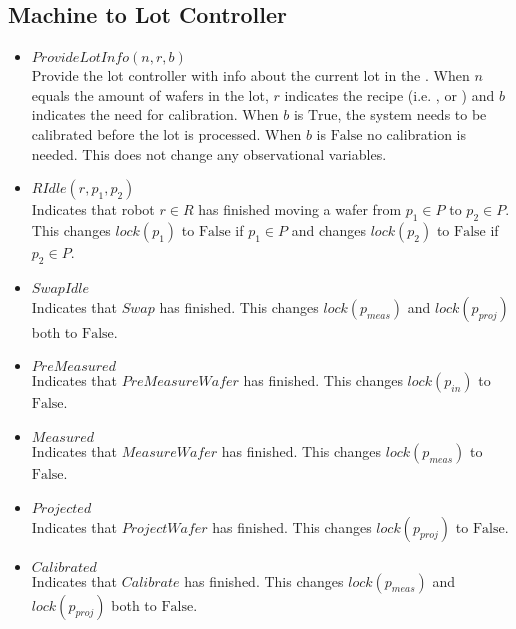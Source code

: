 \subsection{Machine to Lot Controller}
\begin{itemize}
    \item $\mathit{ProvideLotInfo}(n, r, b)$ \\
    Provide the lot controller with info about the current lot in the \tray.
    When $n$ equals the amount of wafers in the lot, $r$ indicates the recipe (i.e. \recipeOne, \recipeTwo or \recipeThree) and $b$ indicates the need for calibration.
    When $b$ is $\text{True}$, the system needs to be calibrated before the lot is processed.
    When $b$ is $\text{False}$ no calibration is needed.
    This does not change any observational variables.

    \item $\mathit{RIdle(r, p_1, p_2)}$ \\
    Indicates that robot $r \in R$ has finished moving a wafer from $p_1 \in P$ to $p_2 \in P$.
    This changes $\mathit{lock}(p_1)$ to $\text{False}$ if $p_1 \in P$ and changes $\mathit{lock}(p_2)$ to $\text{False}$ if $p_2 \in P$.
    
    \item $\mathit{SwapIdle}$ \\
    Indicates that $\mathit{Swap}$ has finished.
    This changes $\mathit{lock}(p_\mathit{meas})$ and $\mathit{lock}(p_\mathit{proj})$ both to $\text{False}$.

    \item $\mathit{PreMeasured}$ \\
    Indicates that $\mathit{PreMeasureWafer}$ has finished.
    This changes $\mathit{lock}(p_\mathit{in})$ to $\text{False}$.

    \item $\mathit{Measured}$ \\
    Indicates that $\mathit{MeasureWafer}$ has finished.
    This changes $\mathit{lock}(p_\mathit{meas})$ to $\text{False}$.

    \item $\mathit{Projected}$ \\
    Indicates that $\mathit{ProjectWafer}$ has finished.
    This changes $\mathit{lock}(p_\mathit{proj})$ to $\text{False}$.

    \item $\mathit{Calibrated}$ \\
    Indicates that $\mathit{Calibrate}$ has finished.
    This changes $\mathit{lock}(p_\mathit{meas})$ and $\mathit{lock}(p_\mathit{proj})$ both to $\text{False}$.

\end{itemize}

